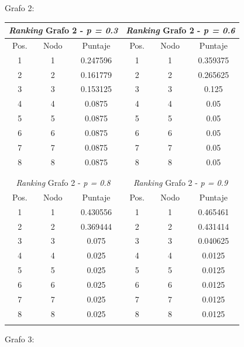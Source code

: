 Grafo 2:

\begin{center}
         \begin{tabular}{|c|c|c||c|c|c|}
                    \hline
                    \multicolumn{3}{|c||}{\emph{Ranking} Grafo 2 - \emph{p = 0.3}} & \multicolumn{3}{c|}{\emph{Ranking} Grafo 2 - \emph{p = 0.6}} \\ \hline
                    Pos. & Nodo & Puntaje    & Pos. & Nodo & Puntaje  \\ \hline
1 & 1 &  0.247596 & 1 & 1 & 0.359375 \\ 
2 & 2 &  0.161779 & 2 & 2 & 0.265625 \\
3 & 3 &  0.153125  & 3 & 3 & 0.125 \\
4 & 4 &  0.0875  & 4 & 4 &  0.05 \\
5 & 5 &  0.0875  & 5 & 5 &  0.05 \\
6 & 6 &  0.0875  & 6 & 6 &  0.05 \\
7 & 7 &  0.0875  & 7 & 7 &  0.05 \\
8 & 8 &  0.0875  & 8 & 8 &  0.05 \\
 \\ \hline
                    \multicolumn{6}{c}{} \\ \hline
                    \multicolumn{3}{|c||}{\emph{Ranking} Grafo 2 - \emph{p = 0.8}} & \multicolumn{3}{c|}{\emph{Ranking} Grafo 2 - \emph{p = 0.9}} \\ \hline
                    Pos. & Nodo & Puntaje    & Pos. & Nodo & Puntaje  \\ \hline
1 & 1 & 0.430556 & 1 & 1 & 0.465461 \\ 
2 & 2 & 0.369444 & 2 & 2 & 0.431414 \\
3 & 3 & 0.075  & 3 & 3 & 0.040625 \\
4 & 4 & 0.025  & 4 & 4 & 0.0125 \\
5 & 5 & 0.025  & 5 & 5 & 0.0125 \\
6 & 6 & 0.025  & 6 & 6 & 0.0125 \\
7 & 7 & 0.025  & 7 & 7 & 0.0125 \\
8 & 8 & 0.025  & 8 & 8 & 0.0125 \\

 \\ \hline

                \end{tabular}
            \end{center}
            
Grafo 3: 

